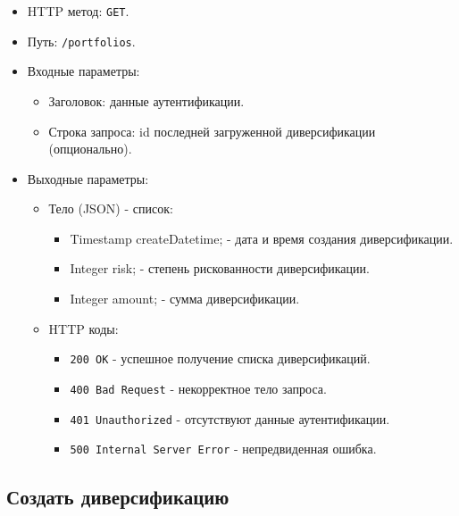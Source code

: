 \documentclass[a4paper, 14pt]{article}
\begin{document}
\begin{itemize}
    \item HTTP метод: \texttt{GET}.
    \item Путь: \texttt{/portfolios}.
    \item Входные параметры:
    \begin{itemize}
        \item Заголовок: данные аутентификации.
        \item Строка запроса: id последней загруженной диверсификации (опционально).
    \end{itemize}
    \item Выходные параметры:
    \begin{itemize}
        \item Тело (JSON) - список:
        \begin{itemize}
            \item Timestamp createDatetime; - дата и время создания диверсификации.
            \item Integer risk; - степень рискованности диверсификации.
            \item Integer amount; - сумма диверсификации.
        \end{itemize}
        \item HTTP коды:
        \begin{itemize}
            \item \texttt{200 OK} - успешное получение списка диверсификаций.
            \item \texttt{400 Bad Request} - некорректное тело запроса.
            \item \texttt{401 Unauthorized} - отсутствуют данные аутентификации.
            \item \texttt{500 Internal Server Error} - непредвиденная ошибка.
        \end{itemize}
    \end{itemize}
\end{itemize}

\subsection{Создать диверсификацию}
\end{document}
